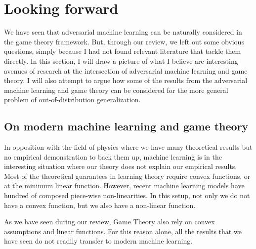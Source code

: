 \section{Looking forward}
\label{sec-forward}
We have seen that adversarial machine learning can be naturally considered in the game theory framework. But, through our review, we left out some obvious questions, simply because I had not found relevant literature that tackle them directly. In this section, I will draw a picture of what I believe are interesting avenues of research at the intersection of adversarial machine learning and game theory. I will also attempt to argue how some of the results from the adversarial machine learning and game theory can be considered for the more general problem of out-of-distribution generalization.

\subsection{On modern machine learning and game theory}
In opposition with the field of physics where we have many theoretical results but no empirical demonstration to back them up, machine learning is in the interesting situation where our theory does not explain our empirical results. Most of the theoretical guarantees in learning theory require convex functions, or at the minimum linear function. However, recent machine learning models have hundred of composed piece-wise non-linearities. In this setup, not only we do not have a convex function, but we also have a non-linear function.

As we have seen during our review, Game Theory also rely on convex assumptions and linear functions. For this reason alone, all the results that we have seen do not readily transfer to modern machine learning. 